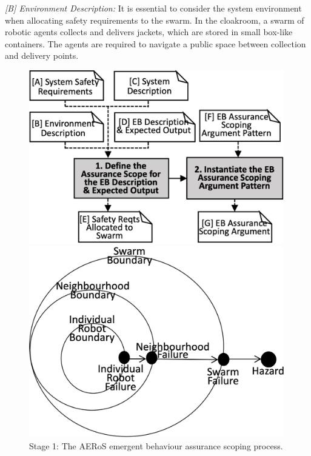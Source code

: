 \documentclass[runningheads]{llncs}
\begin{document}
\emph{[B] Environment Description:}
It is essential to consider the system environment when allocating safety requirements to the swarm. 
In the cloakroom, a swarm of robotic agents collects and delivers jackets, which are stored in small box-like containers. 
The agents are required to navigate a public space between collection and delivery points. 
\begin{figure}[!b]
	\vspace{-6ex}
	\centering
	\begin{minipage}[b]{.5\textwidth}
		\centering
		\includegraphics[width=0.99\textwidth]{figures/AERoS-Stage1.pdf}%
		\vspace{-1ex}%
		\caption{Stage 1: The AERoS emergent behaviour assurance scoping process.}
		\label{amlas-a-stage1}
	\end{minipage}%
	\hspace*{.03\textwidth}
	\begin{minipage}[b]{.5\textwidth}
		\includegraphics[width=0.99\textwidth]{figures/stage1-failureevents-v4.png}

\end{minipage}
\end{figure}
\end{document}
